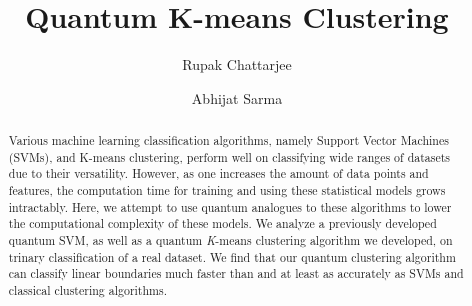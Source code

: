 \documentclass[twocolumn, english]{revtex4-2}
\numberwithin{equation}{section}
\begin{document}
\title{Quantum K-means Clustering}
\author{Rupak Chattarjee}
\author{Abhijat Sarma}
\begin{abstract}
Various machine learning classification algorithms, namely Support Vector Machines (SVMs), and K-means clustering, perform well on classifying wide ranges of datasets due to their versatility. However, as one increases the amount of data points and features, the computation time for training and using these statistical models grows intractably. Here, we attempt to use quantum analogues to these algorithms to lower the computational complexity of these models. We analyze a previously developed quantum SVM, as well as a quantum \textit{K}-means clustering algorithm we developed, on trinary classification of a real dataset. We find that our quantum clustering algorithm can classify linear boundaries much faster than and at least as accurately as SVMs and classical clustering algorithms.
\end{abstract}
\maketitle
\end{document}
